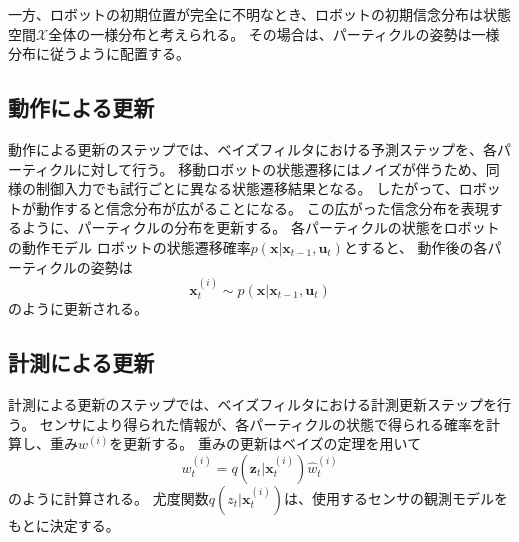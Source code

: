 一方、ロボットの初期位置が完全に不明なとき、ロボットの初期信念分布は状態空間$\mathcal{X}$全体の一様分布と考えられる。
その場合は、パーティクルの姿勢は一様分布に従うように配置する。



\subsection{動作による更新}

動作による更新のステップでは、ベイズフィルタにおける予測ステップを、各パーティクルに対して行う。
移動ロボットの状態遷移にはノイズが伴うため、同様の制御入力でも試行ごとに異なる状態遷移結果となる。
したがって、ロボットが動作すると信念分布が広がることになる。
この広がった信念分布を表現するように、パーティクルの分布を更新する。
各パーティクルの状態をロボットの動作モデル
ロボットの状態遷移確率$p(\bm{x} | \bm{x}_{t-1}, \bm{u}_{t})$とすると、
動作後の各パーティクルの姿勢は
\begin{equation}
\label{particle trans prob}
  \bm{x}^{(i)}_{t} \sim p(\bm{x} | \bm{x}_{t-1}, \bm{u}_{t})
\end{equation}
のように更新される。


\subsection{計測による更新}

計測による更新のステップでは、ベイズフィルタにおける計測更新ステップを行う。
センサにより得られた情報が、各パーティクルの状態で得られる確率を計算し、重み$w^{(i)}$を更新する。
重みの更新はベイズの定理を用いて
\begin{equation}
\label{weight}
  w^{(i)}_{t} = q(\bm{z}_{t} | \bm{x}^{(i)}_{t}) \hat{w}^{(i)}_{t}
\end{equation}
のように計算される。
尤度関数$q(z_{t} | \bm{x}^{(i)}_{t})$は、使用するセンサの観測モデルをもとに決定する。

